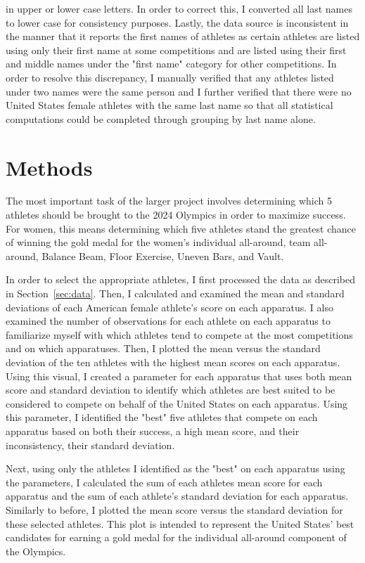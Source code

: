 \documentclass[12pt]{article}
\begin{document}
in upper or lower case letters. In order to correct this, I converted all last names to lower case for consistency 
purposes. Lastly, the data source is inconsistent in the manner that it reports the first names of athletes as certain
athletes are listed using only their first name at some competitions and are listed using their first and middle names 
under the "first name" category for other competitions. In order to resolve this discrepancy, I manually verified that 
any athletes listed under two names were the same person and I further verified that there were no United States female 
athletes with the same last name so that all statistical computations could be completed through grouping by last 
name alone.

\section{Methods}
\label{sec:meth}

The most important task of the larger project involves determining which 5 athletes
should be brought to the 2024 Olympics in order to maximize success. For women, this means determining 
which five athletes stand the greatest chance of winning the gold medal for the women's individual all-around,
team all-around, Balance Beam, Floor Exercise, Uneven Bars, and Vault. 

In order to select the appropriate athletes, I first processed the data as described in Section~\ref{sec:data}.
Then, I calculated and examined the mean and standard deviations of each American female athlete's score 
on each apparatus. I also examined the number of observations for each athlete on each apparatus to familiarize 
myself with which athletes tend to compete at the most competitions and on which apparatuses. Then, I plotted 
the mean versus the standard deviation of the ten athletes with the highest mean scores on each apparatus. 
Using this visual, I created a parameter for each apparatus that uses both mean score and standard 
deviation to identify which athletes are best suited to be considered to compete on behalf of the United 
States on each apparatus. Using this parameter, I identified the "best" five athletes that compete on
each apparatus based on both their success, a high mean score, and their inconsistency, their standard deviation. 

Next, using only the athletes I identified as the "best" on each apparatus using the parameters, 
I calculated the sum of each athletes mean score for each apparatus and the sum of each athlete's standard 
deviation for each apparatus. Similarly to before, I plotted the mean score versus the standard deviation for 
these selected athletes. This plot is intended to represent
the United States' best candidates for earning a gold medal for the individual all-around component of the Olympics.
\end{document}
